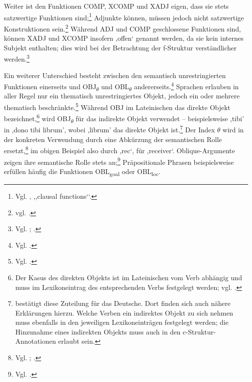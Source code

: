 \documentclass[12pt,a4paper]{article}
\begin{document}
Weiter ist den Funktionen COMP, XCOMP und XADJ eigen, dass sie stets satzwertige Funktionen sind;\footnote{Vgl. \cite[24]{Dal}, ,,clausal functions‘‘.} Adjunkte können, müssen jedoch nicht satzwertige Konstruktionen sein.\footnote{vgl. \cite[40]{Skript}.} Während ADJ und COMP geschlossene Funktionen sind, können XADJ und XCOMP insofern ,offen‘ genannt werden, da sie kein internes Subjekt enthalten; dies wird bei der Betrachtung der f-Struktur verständlicher werden.\footnote{Vgl. \cite[10; 14; 24]{Dal}; \cite[54]{Skript}.}

Ein weiterer Unterschied besteht zwischen den semantisch unrestringierten Funktionen einerseits und OBJ\textsubscript{$\theta$} und OBL\textsubscript{$\theta$} andererseits.\footnote{Vgl. \cite[10; 15-7]{Dal}.} Sprachen erlauben in aller Regel nur ein thematisch unrestringiertes Objekt, jedoch ein oder mehrere thematisch beschränkte.\footnote{Vgl. \cite[21]{Dal}.} Während OBJ im Lateinischen das direkte Objekt bezeichnet,\footnote{Der Kasus des direkten Objekts ist im Lateinischen vom Verb abhängig und muss im Lexikoneintrag des entsprechenden Verbs festgelegt werden; vgl. \cite[30]{Skript}.} wird OBJ\textsubscript{$\theta$} für das indirekte Objekt verwendet – beispielsweise ,tibi' in ,dono tibi librum', wobei ,librum' das direkte Objekt ist.\footnote{\cite[30]{Skript} bestätigt diese Zuteilung für das Deutsche. Dort finden sich auch nähere Erklärungen hierzu. Welche Verben ein indirektes Objekt zu sich nehmen muss ebenfalls in den jeweiligen Lexikoneinträgen festgelegt werden; die Hinzunahme eines indirekten Objekts muss auch in den c-Struktur-Annotationen erlaubt sein.}  Der Index $\theta$ wird in der konkreten Verwendung durch eine Abkürzung der semantischen Rolle ersetzt,\footnote{Vgl. \cite[32]{Skript}; \cite[21]{Rohrer}.} im obigen Beispiel also durch ,rec‘, für ,receiver‘. Oblique-Argumente zeigen ihre semantische Rolle stets an;\footnote{Vgl. \cite[26]{Dal}.} Präpositionale Phrasen beispielsweise erfüllen häufig die Funktionen OBL\textsubscript{goal} oder OBL\textsubscript{loc}.
\end{document}
